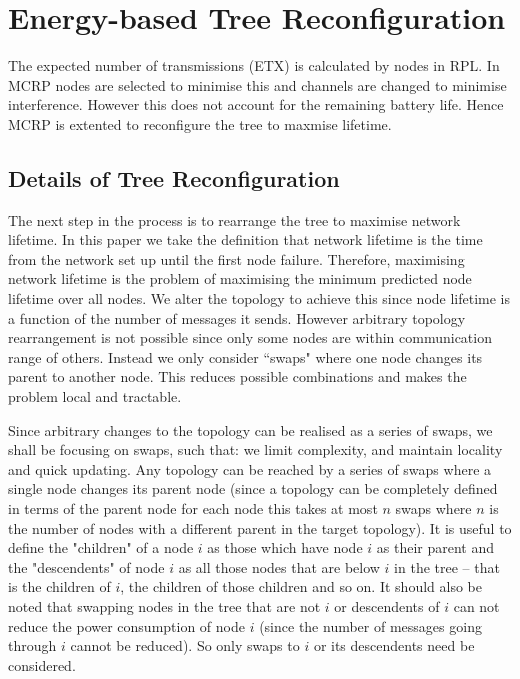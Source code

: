 \section{Energy-based Tree Reconfiguration}
\label{OptimalTree}

The expected number of transmissions (ETX) is calculated by nodes in RPL.  In MCRP nodes are selected to minimise this and channels are changed to minimise interference. However this does not account for the remaining battery life. Hence MCRP is extented to reconfigure the tree to maxmise lifetime.

\subsection{Details of Tree Reconfiguration}

The next step in the process is to rearrange the tree to maximise network lifetime.  In this paper we take the definition that network lifetime is the time from the network set up until the first node failure.  Therefore, maximising network lifetime is the problem of maximising the minimum predicted node lifetime over all nodes.  We alter the topology to achieve this since node lifetime is a function of the number of messages it sends.  However arbitrary topology rearrangement is not possible since only some nodes are within communication range of others.  Instead we only consider ``swaps" where one node changes its parent to another node. 
This reduces possible combinations and makes the problem local and tractable.

Since arbitrary changes to the topology can be realised as a series of swaps, we shall be focusing on swaps, such that: we limit complexity, and maintain locality and quick updating.
Any topology can be reached by a series of swaps where 
a single node changes its parent node (since a topology can be completely defined in terms of the parent node for each node this takes at most $n$ swaps where $n$ is the number of nodes with a different parent in the target topology).  It is useful to define the "children" of a node $i$ as those which have node $i$ as their parent and the "descendents" of node $i$ as all those nodes that are below $i$ in the tree -- that is the children of $i$, the children of those children and so on.  It should also be noted that swapping nodes in the tree that are not $i$ or descendents of $i$ can not reduce the power consumption of node $i$ (since the number of messages going through $i$ cannot be reduced).  So only swaps to $i$ or its descendents need be considered.

